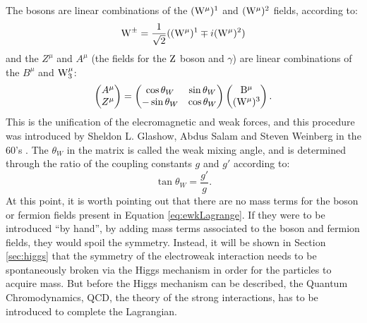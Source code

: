 The \PW bosons are linear combinations of the $(\mathrm{W}^{\mu})^{1}$ and $(\mathrm{W}^{\mu})^{2}$  fields, according to:
\begin{equation} 
\mathrm{W}^{\pm}=\frac{1}{\sqrt{2}}((\mathrm{W}^{\mu})^{1}\mp i(\mathrm{W}^{\mu})^{2})
\label{eq:Widentities}
\end{equation} 
and the $Z^{\mu}$ and $A^{\mu}$ (the fields for the $\mathrm{Z}$ boson and $\gamma$) are linear combinations of the $B^{\mu}$ and $\mathrm{W}_{3}^{\mu}$: 
\begin{equation} 
\begin{pmatrix} A^{\mu}\\ Z^{\mu}\end{pmatrix}=
\begin{pmatrix} 
    \cos\theta_{W}  & \sin\theta_{W}\\
    -\sin\theta_{W} & \cos\theta_{W}\\
\end{pmatrix}
\begin{pmatrix} \mathrm{B}^{\mu}\\ (\mathrm{W}^{\mu})^{3}\end{pmatrix}.
\label{eq:Zidentities}
\end{equation} 
This is the unification of the elecromagnetic and weak forces, and this procedure was introduced by Sheldon L. Glashow, Abdus Salam and Steven Weinberg in the 60's \cite{Glashow:1961tr,Salam:1968rm,Weinberg:1967tq}. 
The $\theta_{W}$ in the matrix is called the weak mixing angle, and is determined through the ratio of the coupling constants $g$ and $g'$ according to:
\begin{equation}
\tan\theta_{W}=\frac{g'}{g}.
\end{equation}
At this point, it is worth pointing out that there are no mass terms for the boson or fermion fields present in Equation \ref{eq:ewkLagrange}. 
If they were to be introduced ``by hand'', by adding mass terms associated to the boson and fermion fields, they would spoil the symmetry. 
Instead, it will be shown in Section \ref{sec:higgs} that the symmetry of the electroweak interaction needs to be spontaneously broken via the Higgs mechanism in order for the particles to acquire mass.
But before the Higgs mechanism can be described, the Quantum Chromodynamics, QCD, the theory of the strong interactions, has to be introduced to complete the Lagrangian.  
